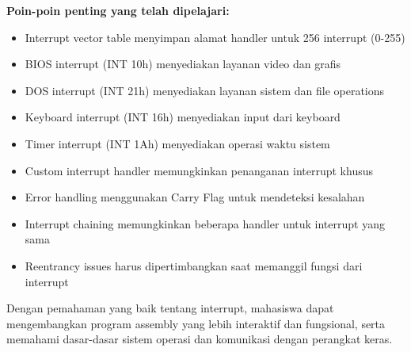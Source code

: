 \documentclass[../main.tex]{subfiles}
\begin{document}
        \textbf{Poin-poin penting yang telah dipelajari:}
        \begin{itemize}
            \item Interrupt vector table menyimpan alamat handler untuk 256 interrupt (0-255)
            \item BIOS interrupt (INT 10h) menyediakan layanan video dan grafis
            \item DOS interrupt (INT 21h) menyediakan layanan sistem dan file operations
            \item Keyboard interrupt (INT 16h) menyediakan input dari keyboard
            \item Timer interrupt (INT 1Ah) menyediakan operasi waktu sistem
            \item Custom interrupt handler memungkinkan penanganan interrupt khusus
            \item Error handling menggunakan Carry Flag untuk mendeteksi kesalahan
            \item Interrupt chaining memungkinkan beberapa handler untuk interrupt yang sama
            \item Reentrancy issues harus dipertimbangkan saat memanggil fungsi dari interrupt
        \end{itemize}

        Dengan pemahaman yang baik tentang interrupt, mahasiswa dapat mengembangkan program assembly yang lebih interaktif dan fungsional, serta memahami dasar-dasar sistem operasi dan komunikasi dengan perangkat keras.
\end{document}
